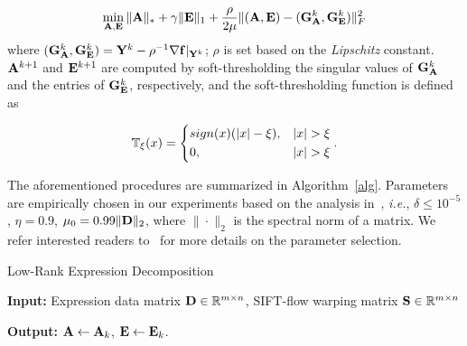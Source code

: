 \documentclass[journal]{IEEEtran}
\begin{document}
\begin{equation} \label{eq:apg_fast}
\min_{\A,\E} \|\A\|_* + \gamma \|\E\|_1 + \frac{\rho}{2\mu}\|(\A,\E)-(\G^k_\A,\G^k_\E)\|^2_F
\end{equation}
where $(\G^k_\A,\G^k_\E)=\Y^k-\rho^{-1}\nabla \f|_{\Y^k}$; $\rho$ is set based on the \textit{Lipschitz} constant. $\A^{k+1}$ and $\E^{k+1}$ are computed by soft-thresholding the singular values of $\G^k_\A$ and the entries of $\G^k_\E$, respectively, and the soft-thresholding function is defined as

\begin{equation}
\mathbb{T}_\xi(x)=
	\begin{dcases}
    sign(x)(|x|-\xi),  	& |x|>\xi \\
    0,  								& |x|>\xi
	\end{dcases}.
\end{equation}

The aforementioned procedures are summarized in Algorithm~\ref{alg}. Parameters are empirically chosen in our experiments based on the analysis in~\cite{Lin09}, \textit{i.e.}, $\delta\leq10^{-5}$, $\eta=0.9$, $\mu_0=0.99\|\D\|_2$, where $\|\cdot\|_2$ is the spectral norm of a matrix. We refer interested readers to~\cite{Lin09} for more details on the parameter selection. 

\begin{algorithm}[htb]
    \caption{Low-Rank Expression Decomposition}
    \textbf{Input:} Expression data matrix $\D\in \mathbb{R}^{m\times n}$, SIFT-flow warping matrix $\S\in \mathbb{R}^{m\times n}$\\
    \begin{algorithmic}[1]
			\State{$\D^*=\D+\S$}
				
				
				
			\EndWhile
    \end{algorithmic}
    \textbf{Output:} $\A\leftarrow \A_k$, $\E\leftarrow \E_k$. \\
    \label{alg}
\end{algorithm}
\end{document}

